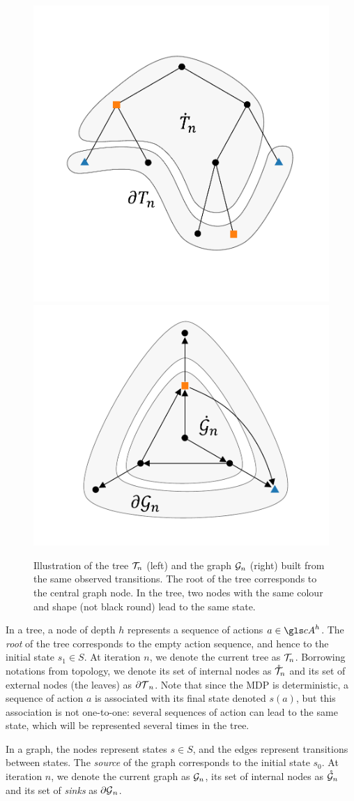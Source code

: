 \begin{figure}[tp]
	\centering
	\includegraphics[trim={1.8cm 2.2cm 1.9cm 2.7cm}, clip,width=0.46\linewidth]{img/gbop/tree_1}
	\hfill
	\includegraphics[trim={1.8cm 1.2cm 1.9cm 0.8cm}, clip,width=0.46\linewidth]{img/gbop/graph_1}
	\caption{Illustration of the tree $\mathcal{T}_n$ (left) and the graph $\mathcal{G}_n$ (right) built from the same observed transitions. The root of the tree corresponds to the central graph node. In the tree, two nodes with the same colour and shape (not black round) lead to the same state.}
	\label{fig:structures}
\end{figure}

In a tree, a node of depth $h$ represents a sequence of actions $a\in \cA^h$. The \emph{root} of the tree corresponds to the empty action sequence, and hence to the initial state $s_1\in S$. At iteration $n$, we denote the current tree as $\mathcal{T}_n$. Borrowing notations from topology, we denote its set of internal nodes as $\mathring{\mathcal{T}}_n$ and its set of external nodes (the leaves) as ${\partial \mathcal{T}}_n$. Note that since the \gls{MDP} is deterministic, a sequence of action $a$ is associated with its final state denoted $s(a)$, but this association is not one-to-one: several sequences of action can lead to the same state, which will be represented several times in the tree.

In a graph, the nodes represent states $s\in S$, and the edges represent transitions between states. The \textit{source} of the graph corresponds to the initial state $s_0$. At iteration $n$, we denote the current graph as $\mathcal{G}_n$, its set of internal nodes as $\mathring{\mathcal{G}}_n$ and its set of \textit{sinks} as ${\partial \mathcal{G}}_n$.

